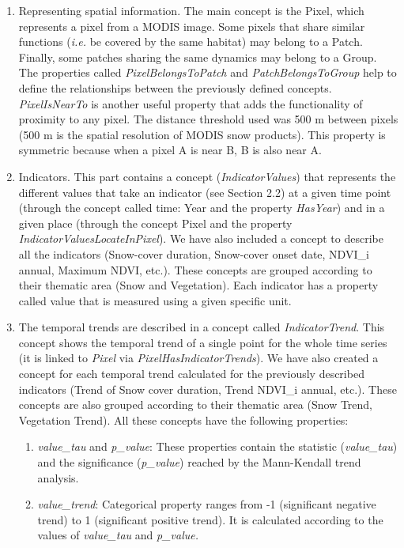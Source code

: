 \begin{enumerate}
    \item Representing spatial information. The main concept is the Pixel, which represents a pixel from a MODIS image. Some pixels that share similar functions (\emph{i.e.} be covered by the same habitat) may belong to a Patch. Finally, some patches sharing the same dynamics may belong to a Group. The properties called \emph{PixelBelongsToPatch} and \emph{PatchBelongsToGroup} help to define the relationships between the previously defined concepts. \emph{PixelIsNearTo} is another useful property that adds the functionality of proximity to any pixel. The distance threshold used was 500 m between pixels (500 m is the spatial resolution of MODIS snow products). This property is symmetric because when a pixel A is near B, B is also near A.
    \item Indicators. This part contains a concept (\emph{IndicatorValues}) that represents the different values that take an indicator (see Section 2.2) at a given time point (through the concept called time: Year and the property \emph{HasYear}) and in a given place (through the concept Pixel and the property \emph{IndicatorValuesLocateInPixel}). We have also included a concept to describe all the indicators (Snow-cover duration, Snow-cover onset date, NDVI\_i annual, Maximum NDVI, etc.). These concepts are grouped according to their thematic area (Snow and Vegetation). Each indicator has a property called value that is measured using a given specific unit.
    \item The temporal trends are described in a concept called \emph{IndicatorTrend}. This concept shows the temporal trend of a single point for the whole time series (it is linked to \emph{Pixel} via \emph{PixelHasIndicatorTrends}). We have also created a concept for each temporal trend calculated for the previously described indicators (Trend of Snow cover duration, Trend NDVI\_i annual, etc.). These concepts are also grouped according to their thematic area (Snow Trend, Vegetation Trend). All these concepts have the following properties:
    \begin{enumerate}
        \item \emph{value\_tau} and \emph{p\_value}: These properties contain the statistic (\emph{value\_tau}) and the significance (\emph{p\_value}) reached by the Mann-Kendall trend analysis.
        \item \emph{value\_trend}: Categorical property ranges from -1 (significant negative trend) to 1 (significant positive trend). It is calculated according to the values of \emph{value\_tau} and \emph{p\_value.}
    \end{enumerate}
\end{enumerate}

